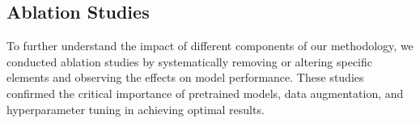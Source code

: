 \subsection{Ablation Studies}
To further understand the impact of different components of our methodology, we conducted ablation studies by systematically removing or altering specific elements and observing the effects on model performance. These studies confirmed the critical importance of pretrained models, data augmentation, and hyperparameter tuning in achieving optimal results.

